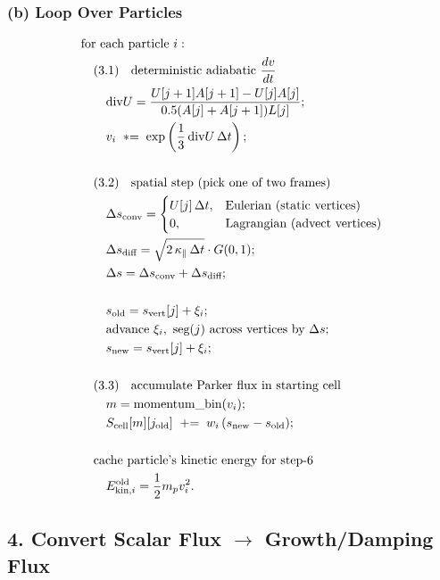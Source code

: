 \subsubsection*{(b) Loop Over Particles}
\[
\begin{aligned}
& \text{for each particle } i: \\
& \quad \text{(3.1) \; deterministic adiabatic } \frac{dv}{dt} \\
& \quad \quad \text{div}U = \frac{U[j+1] A[j+1] - U[j] A[j]}{0.5 (A[j] + A[j+1]) L[j]}; \\
& \quad \quad v_i \; \mathrel{*}= \; \exp\left( \frac{1}{3} \, \text{div}U \, \Delta t \right); \\
\\
& \quad \text{(3.2) \; spatial step (pick one of two frames)} \\
& \quad \quad \Delta s_{\text{conv}} = 
\begin{cases}
U[j] \, \Delta t, & \text{Eulerian (static vertices)} \\
0, & \text{Lagrangian (advect vertices)}
\end{cases} \\
& \quad \quad \Delta s_{\text{diff}} = \sqrt{2 \, \kappa_\parallel \, \Delta t} \cdot G(0,1); \\
& \quad \quad \Delta s = \Delta s_{\text{conv}} + \Delta s_{\text{diff}}; \\
\\
& \quad \quad s_{\text{old}} = s_{\text{vert}}[j] + \xi_i; \\
& \quad \quad \text{advance } \xi_i, \text{ seg}(j) \text{ across vertices by } \Delta s; \\
& \quad \quad s_{\text{new}} = s_{\text{vert}}[j] + \xi_i; \\
\\
& \quad \text{(3.3) \; accumulate Parker flux in starting cell} \\
& \quad \quad m = \text{momentum\_bin}(v_i); \\
& \quad \quad S_{\text{cell}}[m][j_{\text{old}}] \; \mathrel{+}= \; w_i \, (s_{\text{new}} - s_{\text{old}}); \\
\\
& \quad \text{cache particle's kinetic energy for step-6} \\
& \quad \quad E_{\text{kin},i}^{\text{old}} = \frac{1}{2} m_p v_i^2.
\end{aligned}
\]


\subsection*{4. Convert Scalar Flux $\rightarrow$ Growth/Damping Flux}

